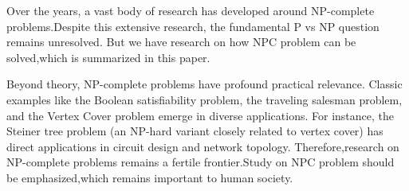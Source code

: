\documentclass[acmsmall]{acmart}
\begin{document}
	Over the years, a vast body of research has developed around NP-complete problems.Despite this extensive research, the fundamental P vs NP question remains unresolved. But we have research on how NPC problem can be solved,which is summarized in this paper.
	
	Beyond theory, NP-complete problems have profound practical relevance. Classic examples like the Boolean satisfiability problem, the traveling salesman problem, and the Vertex Cover problem emerge in diverse applications. For instance, the Steiner tree problem (an NP-hard variant closely related to vertex cover) has direct applications in circuit design and network topology\cite{sipser2012introduction}. Therefore,research on NP-complete problems remains a fertile frontier.Study on NPC problem should be emphasized,which remains important to human society.
	


\end{document}
